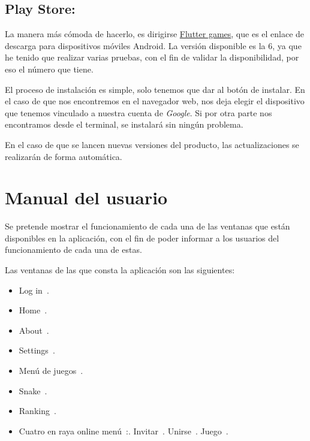 \subsection{Play Store:}
La manera más cómoda de hacerlo, es dirigirse \href{https://play.google.com/store/apps/details?id=com.ubu.flutter_snake}{Flutter games}, que es el enlace de descarga para dispositivos móviles Android. La versión disponible es la 6, ya que he tenido que realizar varias pruebas, con el fin de validar la disponibilidad, por eso el número que tiene.




El proceso de instalación es simple, solo tenemos que dar al botón de instalar. En el caso de que nos encontremos en el navegador web, nos deja elegir el dispositivo que tenemos vinculado a nuestra cuenta de \emph{Google}. Si por otra parte nos encontramos desde el terminal, se instalará sin ningún problema.

En el caso de que se lancen nuevas versiones del producto, las actualizaciones se realizarán de forma automática.

\section{Manual del usuario}
Se pretende mostrar el funcionamiento de cada una de las ventanas que están disponibles en la aplicación, con el fin de poder informar a los usuarios del funcionamiento de cada una de estas.

Las ventanas de las que consta la aplicación son las siguientes:

\begin{itemize}
	\tightlist
	\item Log in~\pageref{login}.
	\item Home~\pageref{home}.
	\item About~\pageref{about}.
	\item Settings~\pageref{settings}.
	\item Menú de juegos~\pageref{menugames}.
	\item Snake~\pageref{snake}.
	\item Ranking~\pageref{rank}.
	\item Cuatro en raya online menú~\pageref{cuatromenu}:.
	\subitem Invitar~\pageref{cuatroinvitar}.
	\subitem Unirse~\pageref{cuatrounirse}.
	\subitem Juego~\pageref{cuatrojuego}.
\end{itemize}


